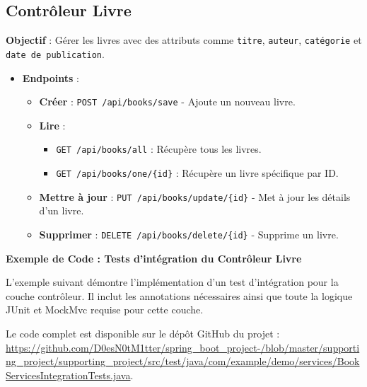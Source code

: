 \documentclass[a4paper,12pt]{article}
\begin{document}
\subsection{Contrôleur Livre}
\textbf{Objectif} : Gérer les livres avec des attributs comme \texttt{titre}, \texttt{auteur}, \texttt{catégorie} et \texttt{date de publication}.
\begin{itemize}
    \item \textbf{Endpoints} :
    \begin{itemize}
        \item \textbf{Créer} : \texttt{POST /api/books/save} - Ajoute un nouveau livre.
        \item \textbf{Lire} :
        \begin{itemize}
            \item \texttt{GET /api/books/all} : Récupère tous les livres.
            \item \texttt{GET /api/books/one/\{id\}} : Récupère un livre spécifique par ID.
        \end{itemize}
        \item \textbf{Mettre à jour} : \texttt{PUT /api/books/update/\{id\}} - Met à jour les détails d'un livre.
        \item \textbf{Supprimer} : \texttt{DELETE /api/books/delete/\{id\}} - Supprime un livre.
    \end{itemize}
\end{itemize}

\textbf{Exemple de Code : Tests d'intégration du Contrôleur Livre}

L'exemple suivant démontre l'implémentation d'un test d'intégration pour la couche contrôleur.  
Il inclut les annotations nécessaires ainsi que toute la logique JUnit et MockMvc requise pour cette couche.

Le code complet est disponible sur le dépôt GitHub du projet :  
\hspace{5}\\

\url{https://github.com/D0esN0tM1tter/spring_boot_project-/blob/master/supporting_project/supporting_project/src/test/java/com/example/demo/services/BookServicesIntegrationTests.java}.
\end{document}
